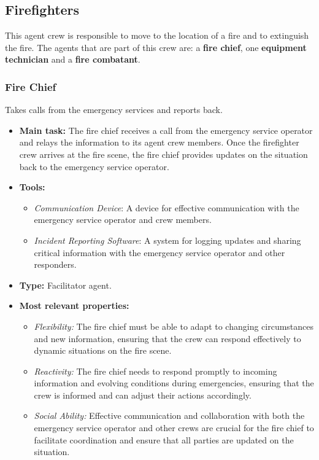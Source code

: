 \subsection{Firefighters}
This agent crew is responsible to move to the location of a fire and to extinguish the fire.
\newline The agents that are part of this crew are: a \textbf{fire chief}, one \textbf{equipment technician} and a \textbf{fire combatant}.

\subsubsection{Fire Chief}
Takes calls from the emergency services and reports back.

\begin{itemize}
    \item \textbf{Main task:} The fire chief receives a call from the emergency service operator and relays the information to its agent crew members. Once the firefighter crew arrives at the fire scene, the fire chief provides updates on the situation back to the emergency service operator.
    \item \textbf{Tools:}
    \begin{itemize}
        \item \textit{Communication Device}: A device for effective communication with the emergency service operator and crew members.
        \item \textit{Incident Reporting Software}: A system for logging updates and sharing critical information with the emergency service operator and other responders.
    \end{itemize}
    \item \textbf{Type:} Facilitator agent.
    \item \textbf{Most relevant properties:}
    \begin{itemize}
        \item \textit{Flexibility:} The fire chief must be able to adapt to changing circumstances and new information, ensuring that the crew can respond effectively to dynamic situations on the fire scene.
        \item \textit{Reactivity:} The fire chief needs to respond promptly to incoming information and evolving conditions during emergencies, ensuring that the crew is informed and can adjust their actions accordingly.
        \item \textit{Social Ability:} Effective communication and collaboration with both the emergency service operator and other crews are crucial for the fire chief to facilitate coordination and ensure that all parties are updated on the situation.
    \end{itemize}
\end{itemize}

